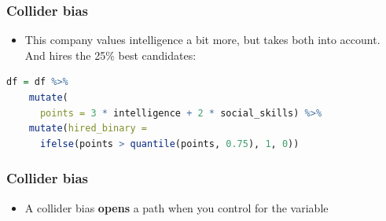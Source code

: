 \documentclass[aspectratio=43]{beamer}
\begin{document}
\begin{frame}[fragile]
\frametitle{Collider bias}
\centering

\begin{itemize}
  \item This company values intelligence a bit more, but takes both into account. And hires the 25\% best candidates:
\end{itemize}

\begin{lstlisting}[language=R]
  df = df %>%
    mutate(
      points = 3 * intelligence + 2 * social_skills) %>%
    mutate(hired_binary =
      ifelse(points > quantile(points, 0.75), 1, 0))
\end{lstlisting}


\end{frame}


  
\begin{frame}
\frametitle{Collider bias}
\centering

\begin{itemize}
  \item A collider bias \textbf{opens} a path when you control for the variable
\end{itemize}

\end{frame}
\end{document}
